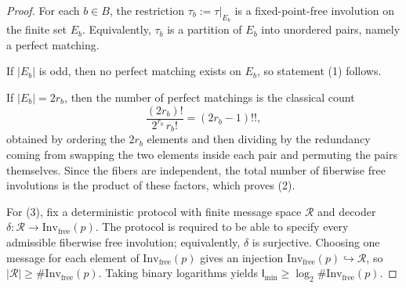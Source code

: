 \begin{proof}
For each \(b\in B\), the restriction \(\tau_b:=\tau|_{E_b}\) is a fixed-point-free involution on the finite set \(E_b\).
Equivalently, \(\tau_b\) is a partition of \(E_b\) into unordered pairs, namely a perfect matching.
\par
If \(|E_b|\) is odd, then no perfect matching exists on \(E_b\), so statement (1) follows.
\par
If \(|E_b|=2r_b\), then the number of perfect matchings is the classical count
\[
\frac{(2r_b)!}{2^{r_b}\,r_b!}=(2r_b-1)!!,
\]
obtained by ordering the \(2r_b\) elements and then dividing by the redundancy coming from swapping the two elements inside each pair and permuting the pairs themselves.
Since the fibers are independent, the total number of fiberwise free involutions is the product of these factors, which proves (2).
\par
For (3), fix a deterministic protocol with finite message space \(\mathcal R\) and decoder \(\delta:\mathcal R\to\mathrm{Inv}_{\mathrm{free}}(p)\).  The protocol is required to be able to specify every admissible fiberwise free involution; equivalently, \(\delta\) is surjective.  Choosing one message for each element of \(\mathrm{Inv}_{\mathrm{free}}(p)\) gives an injection \(\mathrm{Inv}_{\mathrm{free}}(p)\hookrightarrow\mathcal R\), so \(|\mathcal R|\ge\#\mathrm{Inv}_{\mathrm{free}}(p)\).  Taking binary logarithms yields \(\mathsf I_{\min}\ge \log_2\#\mathrm{Inv}_{\mathrm{free}}(p)\). \qedhere
\end{proof}

